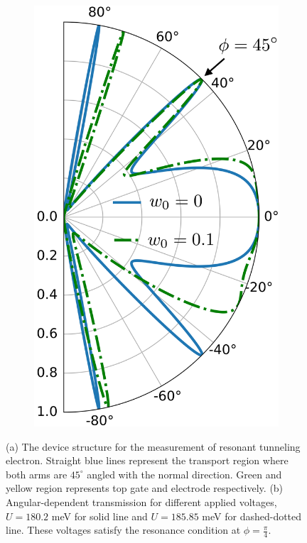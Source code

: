 \begin{figure}[H]
\begin{subfigure}[b]{0.3\linewidth}
            \includegraphics[width=\linewidth]{fig/tp Ef = 0.08 U1 = 0.1802 e1 = 0 e3 = 0.1.png}
            \caption{}
            \label{fig:tp at 45 deg}
        \end{subfigure}
        \caption{(a) The device structure for the measurement of resonant tunneling electron.  
                    Straight blue lines represent the transport region where both arms are $45^{\circ}$ angled with the normal direction. 
                    Green and yellow region represents top gate and electrode respectively. 
                    (b) Angular-dependent transmission for different applied voltages, $U=180.2$ meV for solid line and $U=185.85$ meV for dashed-dotted line. 
                    These voltages satisfy the resonance condition at $\phi = \frac{\pi}{4}$.}
        \label{fig:find w}
    \end{figure}
